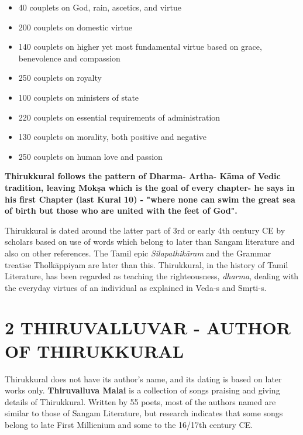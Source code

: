 \begin{itemize}
\item 40 couplets on God, rain, ascetics, and virtue

 \item 200 couplets on domestic virtue

 \item 140 couplets on higher yet most fundamental virtue based on grace, benevolence and compassion

 \item 250 couplets on royalty

 \item 100 couplets on ministers of state

 \item 220 couplets on essential requirements of administration

 \item 130 couplets on morality, both positive and negative

 \item 250 couplets on human love and passion

\end{itemize}

\textbf{Thirukkural follows the pattern of Dharma- Artha- Kāma of Vedic tradition, leaving Mokṣa which is the goal of every chapter- he says in his first Chapter (last Kural 10) - "where none can swim the great sea of birth but those who are united with the feet of God".}

Thirukkural is dated around the latter part of 3rd or early 4th century CE by scholars based on use of words which belong to later than Sangam literature and also on other references. The Tamil epic \textit{Silapathikāram} and the Grammar treatise Tholkāppiyam are later than this. Thirukkural, in the history of Tamil Literature, has been regarded as teaching the righteousness, \textit{dharma}, dealing with the everyday virtues of an individual as explained in Veda-s and Smŗti-s.


\section*{2 THIRUVALLUVAR - AUTHOR OF THIRUKKURAL}

Thirukkural does not have its author’s name, and its dating is based on later works only. \textbf{Thiruvalluva Malai}\endnote{} is a collection of songs praising and giving details of Thirukkural. Written by 55 poets, most of the authors named are similar to those of Sangam Literature, but research indicates that some songs belong to late First Millienium and some to the 16/17th century CE.

